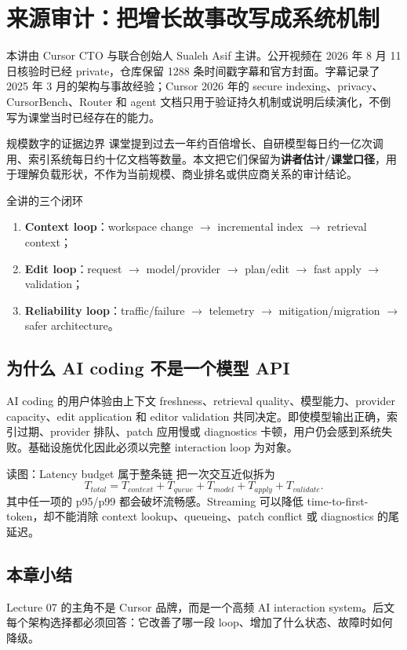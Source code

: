\section{来源审计：把增长故事改写成系统机制}

本讲由 Cursor CTO 与联合创始人 Sualeh Asif 主讲。公开视频在 2026 年 8 月 11 日核验时已经 private，仓库保留 1288 条时间戳字幕和官方封面。字幕记录了 2025 年 3 月的架构与事故经验；Cursor 2026 年的 secure indexing、privacy、CursorBench、Router 和 agent 文档只用于验证持久机制或说明后续演化，不倒写为课堂当时已经存在的能力。

\begin{warningbox}{规模数字的证据边界}
课堂提到过去一年约百倍增长、自研模型每日约一亿次调用、索引系统每日约十亿文档等数量。本文把它们保留为\textbf{讲者估计/课堂口径}，用于理解负载形状，不作为当前规模、商业排名或供应商关系的审计结论。
\end{warningbox}

\begin{importantbox}{全讲的三个闭环}
\begin{enumerate}
  \item \textbf{Context loop}：workspace change $\rightarrow$ incremental index $\rightarrow$ retrieval context；
  \item \textbf{Edit loop}：request $\rightarrow$ model/provider $\rightarrow$ plan/edit $\rightarrow$ fast apply $\rightarrow$ validation；
  \item \textbf{Reliability loop}：traffic/failure $\rightarrow$ telemetry $\rightarrow$ mitigation/migration $\rightarrow$ safer architecture。
\end{enumerate}
\end{importantbox}

\subsection{为什么 AI coding 不是一个模型 API}

AI coding 的用户体验由上下文 freshness、retrieval quality、模型能力、provider capacity、edit application 和 editor validation 共同决定。即使模型输出正确，索引过期、provider 排队、patch 应用慢或 diagnostics 卡顿，用户仍会感到系统失败。基础设施优化因此必须以完整 interaction loop 为对象。


\begin{knowledgebox}{读图：Latency budget 属于整条链}
把一次交互近似拆为
\[
T_{total}=T_{context}+T_{queue}+T_{model}+T_{apply}+T_{validate}.
\]
其中任一项的 p95/p99 都会破坏流畅感。Streaming 可以降低 time-to-first-token，却不能消除 context lookup、queueing、patch conflict 或 diagnostics 的尾延迟。
\end{knowledgebox}


\subsection{本章小结}

Lecture 07 的主角不是 Cursor 品牌，而是一个高频 AI interaction system。后文每个架构选择都必须回答：它改善了哪一段 loop、增加了什么状态、故障时如何降级。

